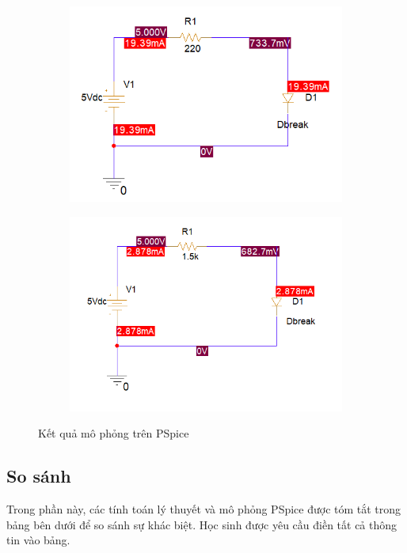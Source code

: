 \begin{figure}[h]
    \centering
    \begin{subfigure}{0.45\textwidth}
        \centering
        \includegraphics[width=0.8\linewidth]{graphics/ex1/f1.PNG}
    \end{subfigure}
    \hfill
    \begin{subfigure}{0.45\textwidth}
        \centering
        \includegraphics[width=0.8\linewidth]{graphics/ex1/f2.PNG}
    \end{subfigure}
    \caption{Kết quả mô phỏng trên PSpice}
    \label{fig:sidebyside}
\end{figure}

\subsection{So sánh}    

Trong phần này, các tính toán lý thuyết và mô phỏng PSpice được tóm tắt trong bảng bên dưới để so sánh sự khác biệt. Học sinh được yêu cầu điền tất cả thông tin vào bảng.

